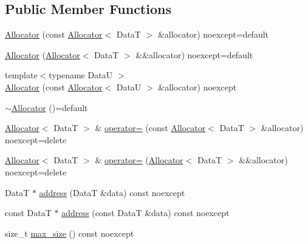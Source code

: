 \subsection*{Public Member Functions}
\begin{DoxyCompactItemize}
\item 
\hyperlink{structmage_1_1_single_ended_memory_stack_1_1_allocator_aee59bcea14f37d52f7f716a02da9dc41}{Allocator} (const \hyperlink{structmage_1_1_single_ended_memory_stack_1_1_allocator}{Allocator}$<$ DataT $>$ \&allocator) noexcept=default
\item 
\hyperlink{structmage_1_1_single_ended_memory_stack_1_1_allocator_a365434b6505598a7de9aae4b323f1c16}{Allocator} (\hyperlink{structmage_1_1_single_ended_memory_stack_1_1_allocator}{Allocator}$<$ DataT $>$ \&\&allocator) noexcept=default
\item 
{\footnotesize template$<$typename DataU $>$ }\\\hyperlink{structmage_1_1_single_ended_memory_stack_1_1_allocator_ac0dc5bf3c1c3293cf081e45ed28101dc}{Allocator} (const \hyperlink{structmage_1_1_single_ended_memory_stack_1_1_allocator}{Allocator}$<$ DataU $>$ \&allocator) noexcept
\item 
\hyperlink{structmage_1_1_single_ended_memory_stack_1_1_allocator_a5b9721b0fb81964988f9f121d6372970}{$\sim$\+Allocator} ()=default
\item 
\hyperlink{structmage_1_1_single_ended_memory_stack_1_1_allocator}{Allocator}$<$ DataT $>$ \& \hyperlink{structmage_1_1_single_ended_memory_stack_1_1_allocator_a5ceb3432ccb26bdf88b0e39775394cbf}{operator=} (const \hyperlink{structmage_1_1_single_ended_memory_stack_1_1_allocator}{Allocator}$<$ DataT $>$ \&allocator) noexcept=delete
\item 
\hyperlink{structmage_1_1_single_ended_memory_stack_1_1_allocator}{Allocator}$<$ DataT $>$ \& \hyperlink{structmage_1_1_single_ended_memory_stack_1_1_allocator_a0e903bdc1db47ed80daa907eccfd2b74}{operator=} (\hyperlink{structmage_1_1_single_ended_memory_stack_1_1_allocator}{Allocator}$<$ DataT $>$ \&\&allocator) noexcept=delete
\item 
DataT $\ast$ \hyperlink{structmage_1_1_single_ended_memory_stack_1_1_allocator_a5bb7b9d5ba3907afb70306f7606ab6cd}{address} (DataT \&data) const noexcept
\item 
const DataT $\ast$ \hyperlink{structmage_1_1_single_ended_memory_stack_1_1_allocator_abe5c2b2a569ff0c61f7c4c7ee4625b05}{address} (const DataT \&data) const noexcept
\item 
size\+\_\+t \hyperlink{structmage_1_1_single_ended_memory_stack_1_1_allocator_a9b000beaef4ac49b2019e6aac93d91f0}{max\+\_\+size} () const noexcept

\end{DoxyCompactItemize}
